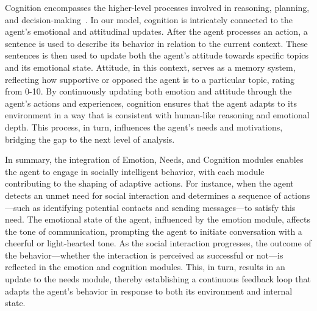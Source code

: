 
Cognition encompasses the higher-level processes involved in reasoning, planning, and decision-making~\cite{bandura1989human}. In our model, cognition is intricately connected to the agent's emotional and attitudinal updates. After the agent processes an action, a sentence is used to describe its behavior in relation to the current context. These sentences is then used to update both the agent’s attitude towards specific topics and its emotional state. Attitude, in this context, serves as a memory system, reflecting how supportive or opposed the agent is to a particular topic, rating from 0-10. By continuously updating both emotion and attitude through the agent’s actions and experiences, cognition ensures that the agent adapts to its environment in a way that is consistent with human-like reasoning and emotional depth. This process, in turn, influences the agent’s needs and motivations, bridging the gap to the next level of analysis.

In summary, the integration of Emotion, Needs, and Cognition modules enables the agent to engage in socially intelligent behavior, with each module contributing to the shaping of adaptive actions. For instance, when the agent detects an unmet need for social interaction and determines a sequence of actions—such as identifying potential contacts and sending messages—to satisfy this need. The emotional state of the agent, influenced by the emotion module, affects the tone of communication, prompting the agent to initiate conversation with a cheerful or light-hearted tone. As the social interaction progresses, the outcome of the behavior—whether the interaction is perceived as successful or not—is reflected in the emotion and cognition modules. This, in turn, results in an update to the needs module, thereby establishing a continuous feedback loop that adapts the agent's behavior in response to both its environment and internal state.



